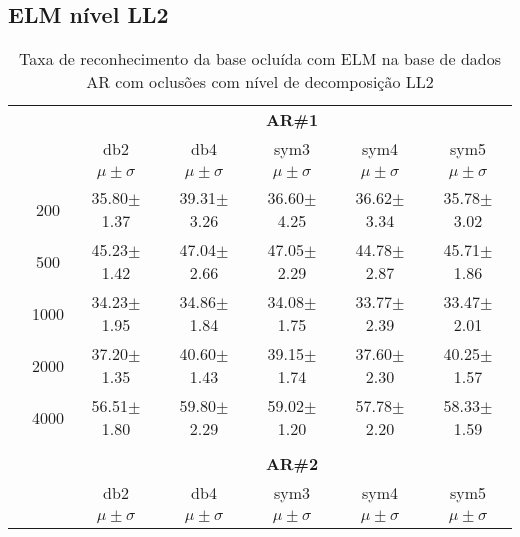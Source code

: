 \subsection{ELM nível LL2}
\begin{table}[H]
	\centering
    \normalsize
	\caption{Taxa de reconhecimento da base ocluída com ELM na base de dados AR com oclusões com nível de decomposição LL2}
	\begin{tabular}{|c|c|c c c c c|}
\cline{3-7}
\multicolumn{2}{c|}{\multirow{3}{*}{}} & \multicolumn{5}{c|}{\textbf{AR\#1}}   \\\cline{3-7} 
\multicolumn{2}{c|}{}  & db2 & db4 & sym3 & sym4 & sym5 \\\cline{3-7}%
\multicolumn{2}{c|}{}& $\mu \pm \sigma$ & $\mu \pm \sigma$ & $\mu \pm \sigma$ & $\mu \pm \sigma$ & $\mu \pm \sigma$ \\\hline


\multicolumn{1}{|c|}{ \multirow{5}{*}{\rotatebox[origin=c]{90}{\textbf{Neurônios}}} }
&200	&35.80$\pm$1.37	&39.31$\pm$3.26 &36.60$\pm$4.25	&36.62$\pm$3.34 &35.78$\pm$3.02	\\\cline{2-7}
&500	&45.23$\pm$1.42	&47.04$\pm$2.66	&47.05$\pm$2.29	&44.78$\pm$2.87	&45.71$\pm$1.86	\\\cline{2-7}
&1000	&34.23$\pm$1.95	&34.86$\pm$1.84	&34.08$\pm$1.75	&33.77$\pm$2.39	&33.47$\pm$2.01	\\\cline{2-7}
&2000	&37.20$\pm$1.35	&40.60$\pm$1.43 &39.15$\pm$1.74	&37.60$\pm$2.30	&40.25$\pm$1.57	\\\cline{2-7}
&4000	&56.51$\pm$1.80	&59.80$\pm$2.29	&59.02$\pm$1.20	&57.78$\pm$2.20	&58.33$\pm$1.59 \\\midrule

\multicolumn{7}{c}{}\\ 

\cline{3-7}
\multicolumn{2}{c|}{\multirow{3}{*}{}} & \multicolumn{5}{c|}{\textbf{AR\#2}}   \\\cline{3-7} 

\multicolumn{2}{c|}{}  & db2 & db4 & sym3 & sym4 & sym5 \\\cline{3-7}
\multicolumn{2}{c|}{}& $\mu \pm \sigma$ & $\mu \pm \sigma$ & $\mu \pm \sigma$ & $\mu \pm \sigma$ & $\mu \pm \sigma$ \\\hline



\end{tabular}
\end{table}
